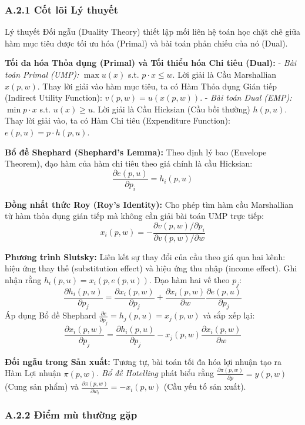 \documentclass[
]{article}
\begin{document}
\subsubsection{A.2.1 Cốt lõi Lý
thuyết}\label{a.2.1-cux1ed1t-luxf5i-luxfd-thuyux1ebft}

Lý thuyết Đối ngẫu (Duality Theory) thiết lập mối liên hệ toán học chặt
chẽ giữa hàm mục tiêu được tối ưu hóa (Primal) và bài toán phản chiếu
của nó (Dual).

\textbf{Tối đa hóa Thỏa dụng (Primal) và Tối thiểu hóa Chi tiêu (Dual):}
- \emph{Bài toán Primal (UMP):} \(\max u(x)\) s.t. \(p \cdot x \leq w\).
Lời giải là Cầu Marshallian \(x(p, w)\). Thay lời giải vào hàm mục tiêu,
ta có Hàm Thỏa dụng Gián tiếp (Indirect Utility Function):
\(v(p, w) = u(x(p, w))\). - \emph{Bài toán Dual (EMP):}
\(\min p \cdot x\) s.t. \(u(x) \geq u\). Lời giải là Cầu Hicksian (Cầu
bồi thường) \(h(p, u)\). Thay lời giải vào, ta có Hàm Chi tiêu
(Expenditure Function): \(e(p, u) = p \cdot h(p, u)\).

\textbf{Bổ đề Shephard (Shephard's Lemma):} Theo định lý bao (Envelope
Theorem), đạo hàm của hàm chi tiêu theo giá chính là cầu Hicksian:
\[ \frac{\partial e(p, u)}{\partial p_i} = h_i(p, u) \]

\textbf{Đồng nhất thức Roy (Roy's Identity):} Cho phép tìm hàm cầu
Marshallian từ hàm thỏa dụng gián tiếp mà không cần giải bài toán UMP
trực tiếp:
\[ x_i(p, w) = - \frac{\partial v(p, w) / \partial p_i}{\partial v(p, w) / \partial w} \]

\textbf{Phương trình Slutsky:} Liên kết sự thay đổi của cầu theo giá qua
hai kênh: hiệu ứng thay thế (substitution effect) và hiệu ứng thu nhập
(income effect). Ghi nhận rằng \(h_i(p, u) = x_i(p, e(p, u))\). Đạo hàm
hai vế theo \(p_j\):
\[ \frac{\partial h_i(p, u)}{\partial p_j} = \frac{\partial x_i(p, w)}{\partial p_j} + \frac{\partial x_i(p, w)}{\partial w} \frac{\partial e(p, u)}{\partial p_j} \]
Áp dụng Bổ đề Shephard
\(\frac{\partial e}{\partial p_j} = h_j(p, u) = x_j(p, w)\) và sắp xếp
lại:
\[ \frac{\partial x_i(p, w)}{\partial p_j} = \frac{\partial h_i(p, u)}{\partial p_j} - x_j(p, w) \frac{\partial x_i(p, w)}{\partial w} \]

\textbf{Đối ngẫu trong Sản xuất:} Tương tự, bài toán tối đa hóa lợi
nhuận tạo ra Hàm Lợi nhuận \(\pi(p, w)\). \emph{Bổ đề Hotelling} phát
biểu rằng \(\frac{\partial \pi(p, w)}{\partial p} = y(p, w)\) (Cung sản
phẩm) và \(\frac{\partial \pi(p, w)}{\partial w_i} = -x_i(p, w)\) (Cầu
yếu tố sản xuất).

\subsubsection{A.2.2 Điểm mù thường
gặp}\label{a.2.2-ux111iux1ec3m-muxf9-thux1b0ux1eddng-gux1eb7p}
\end{document}

